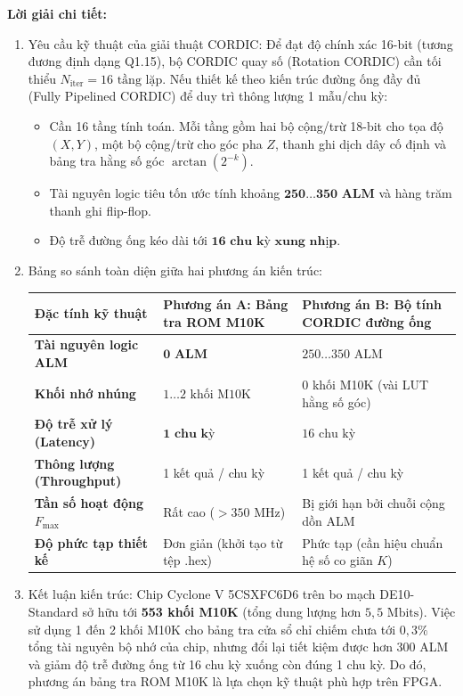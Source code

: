 \textbf{Lời giải chi tiết:}
\begin{enumerate}[label=(\alph*)]
    \item Yêu cầu kỹ thuật của giải thuật CORDIC:
    Để đạt độ chính xác 16-bit (tương đương định dạng Q1.15), bộ CORDIC quay số (Rotation CORDIC) cần tối thiểu $N_{\text{iter}} = 16\text{ tầng lặp}$. 
    Nếu thiết kế theo kiến trúc đường ống đầy đủ (Fully Pipelined CORDIC) để duy trì thông lượng 1 mẫu/chu kỳ:
    \begin{itemize}[leftmargin=1.5em, itemsep=2pt]
        \item Cần 16 tầng tính toán. Mỗi tầng gồm hai bộ cộng/trừ 18-bit cho tọa độ $(X, Y)$, một bộ cộng/trừ cho góc pha $Z$, thanh ghi dịch dây cố định và bảng tra hằng số góc $\arctan(2^{-k})$.
        \item Tài nguyên logic tiêu tốn ước tính khoảng $\mathbf{250 \dots 350\text{ ALM}}$ và hàng trăm thanh ghi flip-flop.
        \item Độ trễ đường ống kéo dài tới $\mathbf{16\text{ chu kỳ xung nhịp}}$.
    \end{itemize}

    \item Bảng so sánh toàn diện giữa hai phương án kiến trúc:
    \begin{center}
    \small
    \begin{tabularx}{\linewidth}{p{3.2cm}XX}
    \toprule
    \textbf{Đặc tính kỹ thuật} & \textbf{Phương án A: Bảng tra ROM M10K} & \textbf{Phương án B: Bộ tính CORDIC đường ống} \\
    \midrule
    \textbf{Tài nguyên logic ALM} & $\mathbf{0\text{ ALM}}$ & $250 \dots 350\text{ ALM}$ \\
    \textbf{Khối nhớ nhúng} & $1 \dots 2\text{ khối M10K}$ & 0 khối M10K (vài LUT hằng số góc) \\
    \textbf{Độ trễ xử lý (Latency)} & $\mathbf{1\text{ chu kỳ}}$ & $16\text{ chu kỳ}$ \\
    \textbf{Thông lượng (Throughput)} & 1 kết quả / chu kỳ & 1 kết quả / chu kỳ \\
    \textbf{Tần số hoạt động $F_{\max}$} & Rất cao ($> 350\text{ MHz}$) & Bị giới hạn bởi chuỗi cộng dồn ALM \\
    \textbf{Độ phức tạp thiết kế} & Đơn giản (khởi tạo từ tệp .hex) & Phức tạp (cần hiệu chuẩn hệ số co giãn $K$) \\
    \bottomrule
    \end{tabularx}
    \end{center}

    \item Kết luận kiến trúc:
    Chip Cyclone V 5CSXFC6D6 trên bo mạch DE10-Standard sở hữu tới \textbf{553 khối M10K} (tổng dung lượng hơn $5{,}5\text{ Mbits}$). Việc sử dụng 1 đến 2 khối M10K cho bảng tra cửa sổ chỉ chiếm chưa tới $0{,}3\%$ tổng tài nguyên bộ nhớ của chip, nhưng đổi lại tiết kiệm được hơn 300 ALM và giảm độ trễ đường ống từ 16 chu kỳ xuống còn đúng 1 chu kỳ. Do đó, phương án bảng tra ROM M10K là lựa chọn kỹ thuật phù hợp trên FPGA.
\end{enumerate}

